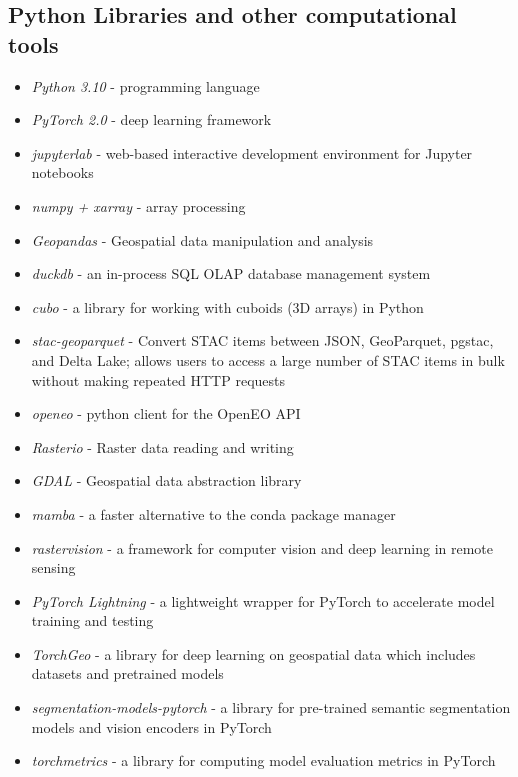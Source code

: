 \begin{multicols}{2}
\subsection{Python Libraries and other computational tools}
\begin{itemize}
    \item \textit{Python 3.10} - programming language  
    \item \textit{PyTorch 2.0} - deep learning framework 
    \item \textit{jupyterlab} - web-based interactive development environment for Jupyter notebooks
    \item \textit{numpy + xarray} - array processing
    \item \textit{Geopandas} - Geospatial data manipulation and analysis
    \item \textit{duckdb} - an in-process SQL OLAP database management system
    \item \textit{cubo} - a library for working with cuboids (3D arrays) in Python
    \item \textit{stac-geoparquet} - Convert STAC items between JSON, GeoParquet, pgstac, and Delta Lake; allows users to access a large number of STAC items in bulk without making repeated HTTP requests
    \item \textit{openeo} - python client for the OpenEO API
    \item \textit{Rasterio} - Raster data reading and writing
    \item \textit{GDAL} - Geospatial data abstraction library
    \item \textit{mamba} - a faster alternative to the conda package manager
    \item \textit{rastervision} - a framework for computer vision and deep learning in remote sensing
    \item \textit{PyTorch Lightning} - a lightweight wrapper for PyTorch to accelerate model training and testing
    \item \textit{TorchGeo} - a library for deep learning on geospatial data which includes datasets and pretrained models
    \item \textit{segmentation-models-pytorch} - a library for pre-trained semantic segmentation models and vision encoders in PyTorch
    \item \textit{torchmetrics} - a library for computing model evaluation metrics in PyTorch
\end{itemize}


\end{multicols}
